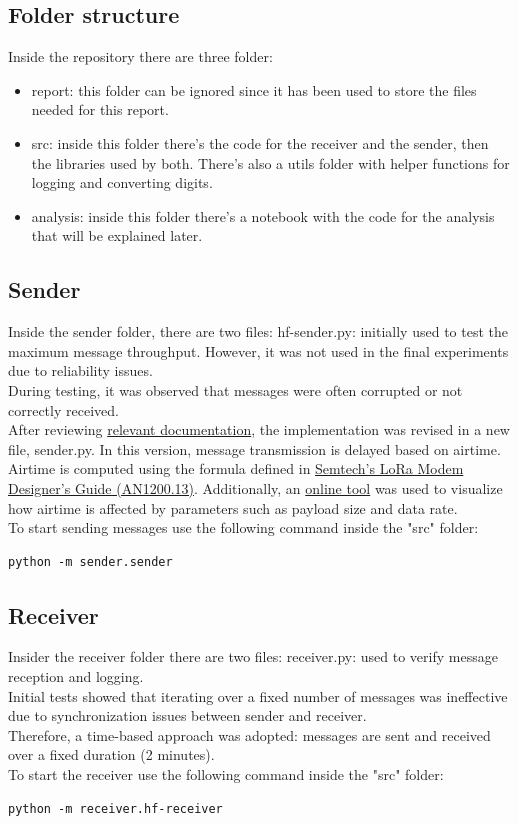 \documentclass[14pt]{article}
\begin{document}
\subsection{Folder structure}
Inside the repository there are three folder:
\begin{itemize}
        \item report: this folder can be ignored since it has been used to store the files needed for this report.
        \item src: inside this folder there's the code for the receiver and the sender, then the libraries used by both. There's also a utils folder with helper functions for logging and converting digits.
        \item analysis: inside this folder there's a notebook with the code for the analysis that will be explained later.
\end{itemize}
\subsection{Sender}
Inside the sender folder, there are two files:
hf-sender.py: initially used to test the maximum message throughput. However, it was not used in the final experiments due to reliability issues. \\
During testing, it was observed that messages were often corrupted or not correctly received. \\
After reviewing \href{https://www.thethingsnetwork.org/docs/lorawan/spreading-factors/}{relevant documentation}, the implementation was revised in a new file, sender.py. In this version, message transmission is delayed based on airtime. \\
Airtime is computed using the formula defined in \href{https://www.mouser.com/pdfdocs/semtech-lora-modem-design.pdf}{Semtech's LoRa Modem Designer's Guide (AN1200.13)}. Additionally, an \href{https://avbentem.github.io/airtime-calculator/ttn/eu868}{online tool} was used to visualize how airtime is affected by parameters such as payload size and data rate. \\
To start sending messages use the following command inside the "src" folder:
\begin{verbatim}
python -m sender.sender 
\end{verbatim}
\subsection{Receiver}
Insider the receiver folder there are two files:
receiver.py: used to verify message reception and logging. \\
Initial tests showed that iterating over a fixed number of messages was ineffective due to synchronization issues between sender and receiver. \\
Therefore, a time-based approach was adopted: messages are sent and received over a fixed duration (2 minutes). \\
To start the receiver use the following command inside the "src" folder:
\begin{verbatim}
python -m receiver.hf-receiver 
\end{verbatim}
\end{document}
